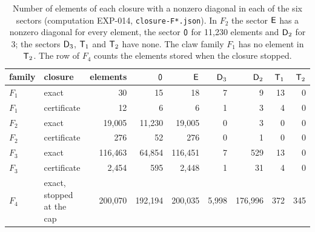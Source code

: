 \begin{table}[t]\centering\small
\begin{tabular}{llrrrrrrr}
\toprule
family & closure & elements & $\mathsf{0}$ & $\mathsf{E}$ & $\mathsf{D}_3$ & $\mathsf{D}_2$ & $\mathsf{T}_1$ & $\mathsf{T}_2$ \\
\midrule
$F_1$ & exact & 30 & 15 & 18 & 7 & 9 & 13 & 0 \\
$F_1$ & certificate & 12 & 6 & 6 & 1 & 3 & 4 & 0 \\
$F_2$ & exact & 19{,}005 & 11{,}230 & 19{,}005 & 0 & 3 & 0 & 0 \\
$F_2$ & certificate & 276 & 52 & 276 & 0 & 1 & 0 & 0 \\
$F_3$ & exact & 116{,}463 & 64{,}854 & 116{,}451 & 7 & 529 & 13 & 0 \\
$F_3$ & certificate & 2{,}454 & 595 & 2{,}448 & 1 & 31 & 4 & 0 \\
$F_4$ & exact, stopped at the cap & 200{,}070 & 192{,}194 & 200{,}035 & 5{,}998 & 176{,}996 & 372 & 345 \\
\bottomrule
\end{tabular}
\caption{Number of elements of each closure with a nonzero diagonal in each of the six sectors (computation EXP-014, \texttt{closure-F*.json}). In $F_2$ the sector $\mathsf{E}$ has a nonzero diagonal for every element, the sector $\mathsf{0}$ for 11{,}230 elements and $\mathsf{D}_2$ for 3; the sectors $\mathsf{D}_3$, $\mathsf{T}_1$ and $\mathsf{T}_2$ have none. The claw family $F_1$ has no element in $\mathsf{T}_2$. The row of $F_4$ counts the elements stored when the closure stopped.}\label{tab:sectors}
\end{table}
